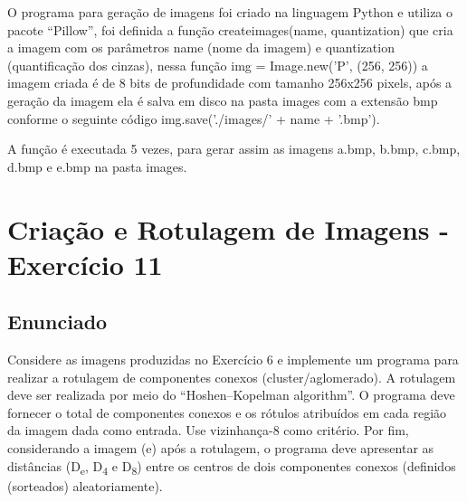 \documentclass[10pt,a4paper]{article}
\begin{document}
\begin{flushleft}
O programa para geração de imagens foi criado na linguagem Python e utiliza o pacote “Pillow”, foi definida a função {\ttfamily create\textunderscore images(name, quantization)} que cria a imagem com os parâmetros name (nome da imagem) e quantization (quantificação dos cinzas), nessa função {\ttfamily img = Image.new('P', (256, 256))} a imagem criada é de 8 bits de profundidade com tamanho 256x256 pixels, após a geração da imagem ela é salva em disco na pasta images com a extensão bmp conforme o seguinte código  {\ttfamily  img.save('./images/' + name + '.bmp')}.
\end{flushleft}

\begin{flushleft}
A função é executada 5 vezes, para gerar assim as imagens a.bmp, b.bmp, c.bmp, d.bmp e e.bmp na pasta images.  
\end{flushleft}

\begin{figure}[H]
    \centering
    \qquad
    \qquad
    \qquad
    \qquad
\end{figure}

\section{Criação e Rotulagem de Imagens - Exercício 11}

\subsection{Enunciado}

\begin{flushleft}
Considere as imagens produzidas no Exercício 6 e implemente um programa para realizar a rotulagem de componentes conexos (cluster/aglomerado). A rotulagem deve ser realizada por meio do “Hoshen–Kopelman algorithm”. O programa deve fornecer o total de componentes conexos e os rótulos atribuídos em cada região da imagem dada como entrada. Use vizinhança-8 como critério. Por fim, considerando a imagem (e) após a rotulagem, o programa deve apresentar as distâncias (D\textsubscript{e}, D\textsubscript{4} e D\textsubscript{8}) entre os centros de dois componentes conexos (definidos (sorteados) aleatoriamente).
\end{flushleft}
\end{document}
